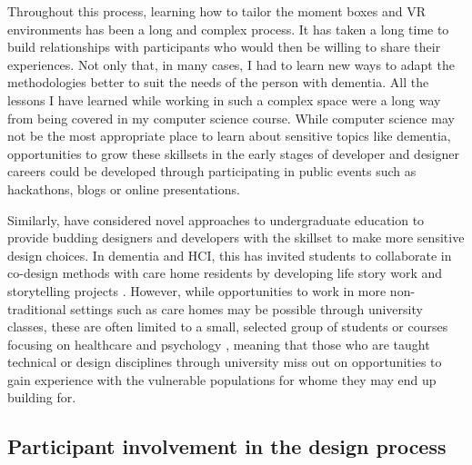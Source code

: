 Throughout this process, learning how to tailor the moment boxes and VR environments has been a long and complex process. It has taken a long time to build relationships with participants who would then be willing to share their experiences. Not only that, in many cases, I had to learn new ways to adapt the methodologies better to suit the needs of the person with dementia. All the lessons I have learned while working in such a complex space were a long way from being covered in my computer science course. While computer science may not be the most appropriate place to learn about sensitive topics like dementia, opportunities to grow these skillsets in the early stages of developer and designer careers could be developed through participating in public events such as hackathons, blogs or online presentations.

Similarly, \cite{hendriks_valuing_2018} have considered novel approaches to undergraduate education to provide budding designers and developers with the skillset to make more sensitive design choices. In dementia and HCI, this has invited students to collaborate in co-design methods with care home residents by developing life story work \citep{mckeown2015you} and storytelling projects \citep{hyden2013storytelling}. However, while opportunities to work in more non-traditional settings such as care homes may be possible through university classes, these are often limited to a small, selected group of students or courses focusing on healthcare and psychology \citep{kinnunen_understanding_2018}, meaning that those who are taught technical or design disciplines through university miss out on opportunities to gain experience with the vulnerable populations for whome they may end up building for. 

\subsection{Participant involvement in the design process}
\label{extent-co-design}

